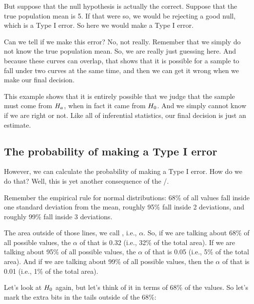 \documentclass[../../../main.tex]{subfiles}
\begin{document}
But suppose that the null hypothesis is actually the correct. Suppose that the true population mean is 5. If that were so, we would be rejecting a good null, which is a Type I error. So here we would make a Type I error.

Can we tell if we make this error? No, not really. Remember that we simply do not know the true population mean. So, we are really just guessing here. And because these curves can overlap, that shows that it is possible for a sample to fall under two curves at the same time, and then we can get it wrong when we make our final decision. 

This example shows that it is entirely possible that we judge that the sample must come from $\AltHyp/$, when in fact it came from $\NullHyp/$. And we simply cannot know if we are right or not. Like all of inferential statistics, our final decision is just an estimate. 


\subsection{The probability of making a Type I error}

However, we can calculate the probability of making a Type I error. How do we do that? Well, this is yet another consequence of the \CLT/. 

Remember the empirical rule for normal distributions: 68\% of all values fall inside one standard deviation from the mean, roughly 95\% fall inside 2 deviations, and roughly 99\% fall inside 3 deviations.

The area outside of those lines, we call , i.e., $\alpha$. So, if we are talking about 68\% of all possible values, the $\alpha$ of that is 0.32 (i.e., 32\% of the total area). If we are talking about 95\% of all possible values, the $\alpha$ of that is 0.05 (i.e., 5\% of the total area). And if we are talking about 99\% of all possible values, then the $\alpha$ of that is 0.01 (i.e., 1\% of the total area).

Let's look at $\NullHyp/$ again, but let's think of it in terms of 68\% of the values. So let's mark the extra bits in the tails outside of the 68\%:
\end{document}
